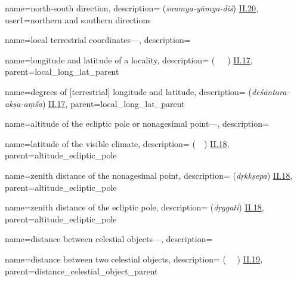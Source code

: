 {
        name={north-south direction},
        description={ (\textit{saumya-yāmya-diś}) \hyperlink{Sii20}{II.20}},
        user1={northern and southern directions}
}

{
        name={local terrestrial coordinates---},
        description={\phantom{x}\nopagebreak}
}

{
        name={longitude and latitude of a locality},
        description={ (\tul\ \va\ \ard\idafaconsonant\ \balad) \hyperlink{Pii17}{II.17}},
        parent={local_long_lat_parent}
}

{
        name={degrees of [terrestrial] longitude and latitude},
        description={ (\textit{deśāntara-akṣa-aṃśa}) \hyperlink{Sii17}{II.17}},
        parent={local_long_lat_parent}
}        

{
        name={altitude of the ecliptic pole or nonagesimal point---},
        description={\phantom{x}\nopagebreak}
}

{
        name={latitude of the visible climate},
        description={  (\ard\idafaconsonant\ \iqlim\idafaconsonant\ \ruyat) \hyperlink{Pii18}{II.18}},
        parent={altitude_ecliptic_pole}
}

{
        name={zenith distance of the nonagesimal point},
        description={ (\textit{dṛkkṣepa}) \hyperlink{Sii18}{II.18}},
        parent={altitude_ecliptic_pole}
}


{
        name={zenith distance of the ecliptic pole},
        description={ (\textit{dṛggati}) \hyperlink{Sii18}{II.18}},
        parent={altitude_ecliptic_pole}
}

{
        name={distance between celestial objects---},
        description={\phantom{x}\nopagebreak}
}

{
        name={distance between two celestial objects},
        description={ (\bud\idafaconsonant\ \miyan\idafaconsonant\ \mbox{\duvum\idafaconsonant} \kawkab) \hyperlink{Pii19}{II.19}},
        parent={distance_celestial_object_parent}
}

